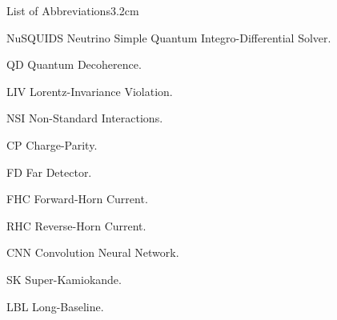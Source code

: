 \begin{mclistof}{List of Abbreviations}{3.2cm}
\item[NuSQUIDS]\hypertarget{abbr:nusquids}{} Neutrino Simple Quantum Integro-Differential Solver.
\item[QD]\hypertarget{abbr:qd}{} Quantum Decoherence.
\item[LIV]\hypertarget{abbr:liv}{} Lorentz-Invariance Violation.
\item[NSI]\hypertarget{abbr:nsi}{} Non-Standard Interactions.
\item[CP]\hypertarget{abbr:cp}{} Charge-Parity.
\item[FD]\hypertarget{abbr:fd}{} Far Detector.
\item[FHC]\hypertarget{abbr:fhc}{} Forward-Horn Current.
\item[RHC]\hypertarget{abbr:rhc}{} Reverse-Horn Current.
\item[CNN]\hypertarget{abbr:cnn}{} Convolution Neural Network.
\item[SK]\hypertarget{abbr:sk}{} Super-Kamiokande.
\item[LBL]\hypertarget{abbr:lbl}{} Long-Baseline.


\end{mclistof} 